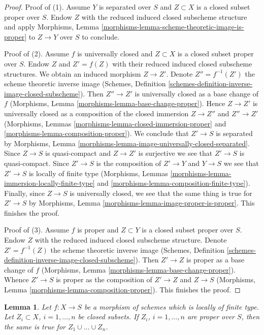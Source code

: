 \documentclass{stacks-project}
\theoremstyle{plain}
\newtheorem{lemma}[subsection]{Lemma}
\theoremstyle{definition}
\theoremstyle{remark}
\numberwithin{equation}{subsection}
\begin{document}
\begin{proof}
Proof of (1). Assume $Y$ is separated over $S$ and $Z \subset X$
is a closed subset proper over $S$. Endow $Z$ with the reduced induced
closed subscheme structure and apply
Morphisms, Lemma \ref{morphisms-lemma-scheme-theoretic-image-is-proper}
to $Z \to Y$ over $S$ to conclude.

\medskip\noindent
Proof of (2). Assume $f$ is universally closed and $Z \subset X$ is a
closed subset proper over $S$. Endow $Z$ and $Z' = f(Z)$ with their reduced
induced closed subscheme structures. We obtain an induced
morphism $Z \to Z'$.
Denote $Z'' = f^{-1}(Z')$ the scheme theoretic inverse image
(Schemes, Definition \ref{schemes-definition-inverse-image-closed-subscheme}).
Then $Z'' \to Z'$ is universally closed as a base change of $f$
(Morphisms, Lemma \ref{morphisms-lemma-base-change-proper}).
Hence $Z \to Z'$ is universally closed as a composition of
the closed immersion $Z \to Z''$ and $Z'' \to Z'$
(Morphisms, Lemmas
\ref{morphisms-lemma-closed-immersion-proper} and
\ref{morphisms-lemma-composition-proper}).
We conclude that $Z' \to S$ is separated by
Morphisms, Lemma \ref{morphisms-lemma-image-universally-closed-separated}.
Since $Z \to S$ is quasi-compact and $Z \to Z'$ is surjective
we see that $Z' \to S$ is quasi-compact.
Since $Z' \to S$ is the composition of $Z' \to Y$ and $Y \to S$
we see that $Z' \to S$ is locally of finite type
(Morphisms, Lemmas \ref{morphisms-lemma-immersion-locally-finite-type} and
\ref{morphisms-lemma-composition-finite-type}).
Finally, since $Z \to S$ is universally closed, we see that
the same thing is true for $Z' \to S$ by
Morphisms, Lemma \ref{morphisms-lemma-image-proper-is-proper}.
This finishes the proof.

\medskip\noindent
Proof of (3). Assume $f$ is proper and $Z \subset Y$ is a closed subset
proper over $S$. Endow $Z$ with the reduced induced closed subscheme
structure. Denote $Z' = f^{-1}(Z)$ the scheme theoretic inverse image
(Schemes, Definition \ref{schemes-definition-inverse-image-closed-subscheme}).
Then $Z' \to Z$ is proper as a base change of $f$
(Morphisms, Lemma \ref{morphisms-lemma-base-change-proper}).
Whence $Z' \to S$ is proper as the composition of $Z' \to Z$
and $Z \to S$
(Morphisms, Lemma \ref{morphisms-lemma-composition-proper}).
This finishes the proof.
\end{proof}

\begin{lemma}
\label{lemma-union-closed-proper-over-base}
Let $f : X \to S$ be a morphism of schemes which is locally of finite type.
Let $Z_i \subset X$, $i = 1, \ldots, n$ be closed subsets.
If $Z_i$, $i = 1, \ldots, n$ are proper over $S$, then the same is
true for $Z_1 \cup \ldots \cup Z_n$.
\end{lemma}
\end{document}
